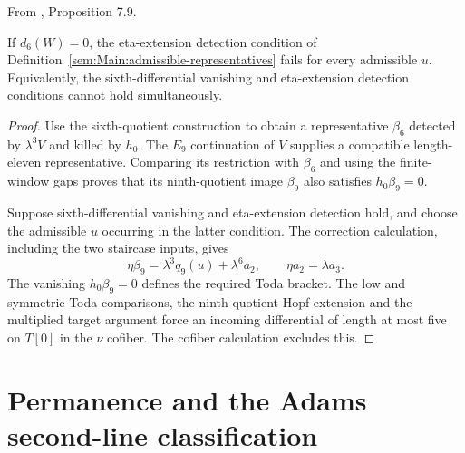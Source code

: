 \begin{proposition}
\label{paper:7.9}
From \cite{LWX126}, Proposition 7.9.\par

\label{prop:state5false}
If $d_6(W)=0$, the eta-extension detection condition of
Definition~\ref{sem:Main:admissible-representatives} fails for every
admissible $u$. Equivalently, the sixth-differential vanishing and
eta-extension detection conditions cannot hold simultaneously.



\end{proposition}
\begin{proof}
Use the sixth-quotient construction to obtain a representative
$\beta_6$ detected by $\lambda^3V$ and killed by $h_0$.
The $E_9$ continuation of $V$ supplies a compatible length-eleven
representative. Comparing its restriction with $\beta_6$ and using the
finite-window gaps proves that its ninth-quotient image $\beta_9$
also satisfies $h_0\beta_9=0$.

Suppose sixth-differential vanishing and eta-extension detection hold,
and choose the admissible $u$ occurring in the latter condition.
The correction calculation, including the two staircase inputs, gives
\[
 \eta\beta_9=\lambda^3q_9(u)+\lambda^6a_2,
 \qquad \eta a_2=\lambda a_3.
\]
The vanishing $h_0\beta_9=0$ defines the required Toda bracket.
The low and symmetric Toda comparisons, the ninth-quotient Hopf extension
and the multiplied target argument force an incoming differential of
length at most five on $T[0]$ in the $\nu$ cofiber. The cofiber calculation
excludes this.
\end{proof}

\section{Permanence and the Adams second-line classification}

